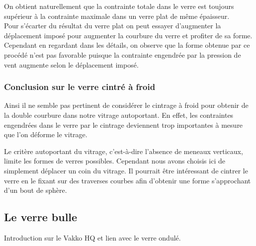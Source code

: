 \documentclass[11pt,titlepage]{article}
\begin{document}
 On obtient naturellement que la contrainte totale dans le verre est toujours supérieur à la contrainte maximale dans un verre plat de même épaisseur. 
\\

Pour s'écarter du résultat du verre plat on peut essayer d'augmenter la déplacement imposé pour augmenter la courbure du verre et profiter de sa forme. Cependant en regardant dans les détails, on observe que la forme obtenue par ce procédé n'est pas favorable puisque la contrainte engendrée par la pression de vent augmente selon le déplacement imposé. 
\subsubsection{Conclusion sur le verre cintré à froid}

Ainsi il ne semble pas pertinent de considérer le cintrage à froid pour obtenir de la double courbure dans notre vitrage autoportant. En effet, les contraintes engendrées dans le verre par le cintrage deviennent trop importantes à mesure que l'on déforme le vitrage. 

Le critère autoportant du vitrage, c'est-à-dire l'absence de meneaux verticaux, limite les formes de verres possibles. Cependant nous avons choisis ici de simplement déplacer un coin du vitrage. Il pourrait être intéressant de cintrer le verre en le fixant sur des traverses courbes afin d'obtenir une forme s'approchant d'un bout de sphère. 

\newpage
\subsection{Le verre bulle}

Introduction sur le Vakko HQ et lien avec le verre ondulé. 
\end{document}
